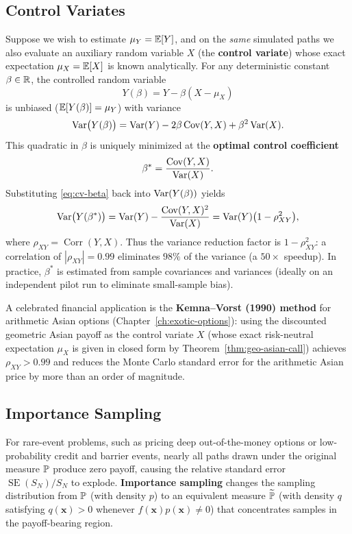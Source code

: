 \subsection*{Control Variates}
Suppose we wish to estimate $\mu_Y = \mathbb{E}[Y]$, and on the \emph{same} simulated paths we also evaluate an auxiliary random variable $X$ (the \textbf{control variate}) whose exact expectation $\mu_X = \mathbb{E}[X]$ is known analytically. For any deterministic constant $\beta \in \mathbb{R}$, the controlled random variable
\[
Y(\beta) = Y - \beta(X - \mu_X)
\]
is unbiased ($\mathbb{E}[Y(\beta)] = \mu_Y$) with variance
\[
\operatorname{Var}\bigl(Y(\beta)\bigr) = \operatorname{Var}(Y) - 2\beta\operatorname{Cov}(Y, X) + \beta^2\operatorname{Var}(X).
\]
This quadratic in $\beta$ is uniquely minimized at the \textbf{optimal control coefficient}
\begin{equation}\label{eq:cv-beta}
\beta^* = \frac{\operatorname{Cov}(Y, X)}{\operatorname{Var}(X)}.
\end{equation}
Substituting \eqref{eq:cv-beta} back into $\operatorname{Var}(Y(\beta))$ yields
\begin{equation}\label{eq:cv-var}
\operatorname{Var}\bigl(Y(\beta^*)\bigr) = \operatorname{Var}(Y) - \frac{\operatorname{Cov}(Y, X)^2}{\operatorname{Var}(X)} = \operatorname{Var}(Y)\bigl(1 - \rho_{XY}^2\bigr),
\end{equation}
where $\rho_{XY} = \operatorname{Corr}(Y, X)$. Thus the variance reduction factor is $1 - \rho_{XY}^2$: a correlation of $|\rho_{XY}| = 0.99$ eliminates $98\%$ of the variance (a $50\times$ speedup). In practice, $\beta^*$ is estimated from sample covariances and variances (ideally on an independent pilot run to eliminate small-sample bias).

A celebrated financial application is the \textbf{Kemna--Vorst (1990) method} for arithmetic Asian options (Chapter~\ref{ch:exotic-options}): using the discounted geometric Asian payoff as the control variate $X$ (whose exact risk-neutral expectation $\mu_X$ is given in closed form by Theorem~\ref{thm:geo-asian-call}) achieves $\rho_{XY} > 0.99$ and reduces the Monte Carlo standard error for the arithmetic Asian price by more than an order of magnitude.

\subsection*{Importance Sampling}
For rare-event problems, such as pricing deep out-of-the-money options or low-probability credit and barrier events, nearly all paths drawn under the original measure $\mathbb{P}$ produce zero payoff, causing the relative standard error $\operatorname{SE}(S_N) / S_N$ to explode. \textbf{Importance sampling} changes the sampling distribution from $\mathbb{P}$ (with density $p$) to an equivalent measure $\widetilde{\mathbb{P}}$ (with density $q$ satisfying $q(\mathbf{x}) > 0$ whenever $f(\mathbf{x})p(\mathbf{x}) \neq 0$) that concentrates samples in the payoff-bearing region.

